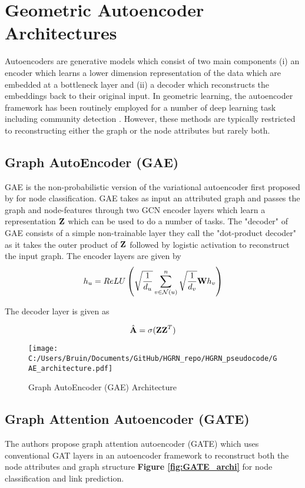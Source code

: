 \documentclass[a4paper,12pt]{article}
\begin{document}
	
	\section{Geometric Autoencoder Architectures}
	Autoencoders are generative models which consist of two main components (i) an encoder which learns a lower dimension representation of the data which are embedded at a bottleneck layer and (ii) a decoder which reconstructs the embeddings back to their original input. In geometric learning, the autoencoder framework has been routinely employed for a number of deep learning task including community detection \cite{kipf2016variational,wang2017mgae,zhou2023community,wang2021scgnn}. However, these methods are typically restricted to reconstructing either the graph or the node attributes but rarely both.  
	\subsection{Graph AutoEncoder (GAE)}
	GAE is the non-probabilistic version of the variational autoencoder first proposed by \cite{kipf2016variational} for node classification. GAE takes as input an attributed graph and passes the graph and node-features through two GCN encoder layers which learn a representation $\bf Z$ which can be used to do a number of tasks. The "decoder" of GAE consists of a simple non-trainable layer they call the "dot-product decoder" as it takes the outer product of $\bf Z$ followed by logistic activation to reconstruct the input graph.  The encoder layers are given by 
	\[ h_u =  ReLU\left(\sqrt{\frac{1}{d_u}}\sum_{v\in \mathcal{N}(u)}^n \sqrt{\frac{1}{d_v}} {\bf W}h_v\right)\]
	
	The decoder layer is given as
	
	\[ \hat{\bf A} = \sigma({\bf ZZ}^T) \]
	\begin{figure}[H]
		\centering
		\caption{Graph AutoEncoder (GAE) Architecture}
		\texttt{[image: C:/Users/Bruin/Documents/GitHub/HGRN\_repo/HGRN\_pseudocode/GAE\_architecture.pdf]}
		\label{fig:gae_mod}
	\end{figure}
	
	
	
	\subsection{Graph Attention Autoencoder (GATE)}
	The authors \cite{salehi2019graph} propose graph attention autoencoder (GATE) which uses conventional GAT layers in an autoencoder framework to reconstruct both the node attributes and graph structure \textbf{Figure \ref{fig:GATE_archi}} for node classification and link prediction. 
	
\end{document}

